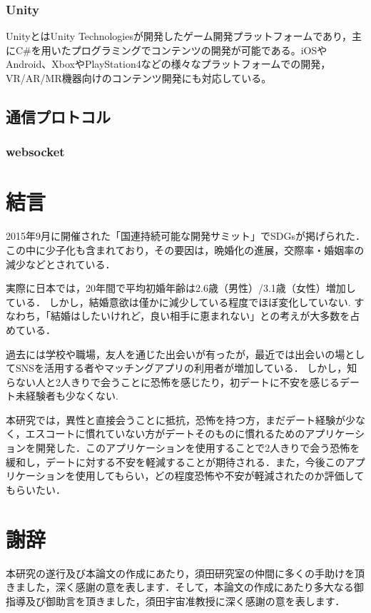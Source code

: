 \documentclass[12pt,a4j,titlepage]{ltjsarticle}
\begin{document}
\subsubsection{Unity}
UnityとはUnity Technologiesが開発したゲーム開発プラットフォームであり，主にC\#を用いたプログラミングでコンテンツの開発が可能である。iOSやAndroid、XboxやPlayStation4などの様々なプラットフォームでの開発，VR/AR/MR機器向けのコンテンツ開発にも対応している。

\subsection{通信プロトコル}
\subsubsection{websocket}

\clearpage

\section{結言}
2015年9月に開催された「国連持続可能な開発サミット」でSDGsが掲げられた．この中に少子化も含まれており，その要因は，晩婚化の進展\cite{sasaki2012}，交際率・婚姻率の減少\cite{naikakufu2019}などとされている．

実際に日本では，20年間で平均初婚年齢は2.6歳（男性）/3.1歳（女性）増加している．
しかし，結婚意欲は僅かに減少している程度でほぼ変化していない.
すなわち，「結婚はしたいけれど，良い相手に恵まれない」との考えが大多数を占めている\cite{naikakufu2019}．

過去には学校や職場，友人を通じた出会いが有ったが，最近では出会いの場としてSNSを活用する者やマッチングアプリの利用者が増加している．
しかし，知らない人と2人きりで会うことに恐怖を感じたり，初デートに不安を感じるデート未経験者も少なくない\cite{prtimes,yoshimura2020}.

本研究では，異性と直接会うことに抵抗，恐怖を持つ方，まだデート経験が少なく，エスコートに慣れていない方がデートそのものに慣れるためのアプリケーションを開発した．このアプリケーションを使用することで2人きりで会う恐怖を緩和し，デートに対する不安を軽減することが期待される．また，今後このアプリケーションを使用してもらい，どの程度恐怖や不安が軽減されたのか評価してもらいたい．

\clearpage



\section{謝辞}
本研究の遂行及び本論文の作成にあたり，須田研究室の仲間に多くの手助けを頂きました，深く感謝の意を表します．そして，本論文の作成にあたり多大なる御指導及び御助言を頂きました，須田宇宙准教授に深く感謝の意を表します．
\end{document}
